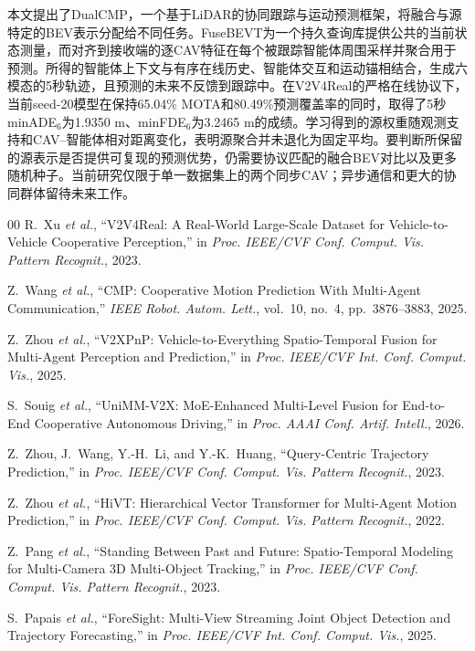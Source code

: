 \documentclass[lettersize,journal]{IEEEtran}
\begin{document}
本文提出了DualCMP，一个基于LiDAR的协同跟踪与运动预测框架，将融合与源特定的BEV表示分配给不同任务。FuseBEVT为一个持久查询库提供公共的当前状态测量，而对齐到接收端的逐CAV特征在每个被跟踪智能体周围采样并聚合用于预测。所得的智能体上下文与有序在线历史、智能体交互和运动锚相结合，生成六模态的5秒轨迹，且预测的未来不反馈到跟踪中。在V2V4Real的严格在线协议下，当前seed-20模型在保持65.04\% MOTA和80.49\%预测覆盖率的同时，取得了5秒minADE$_6$为1.9350 m、minFDE$_6$为3.2465 m的成绩。学习得到的源权重随观测支持和CAV--智能体相对距离变化，表明源聚合并未退化为固定平均。要判断所保留的源表示是否提供可复现的预测优势，仍需要协议匹配的融合BEV对比以及更多随机种子。当前研究仅限于单一数据集上的两个同步CAV；异步通信和更大的协同群体留待未来工作。

\begin{thebibliography}{00}
R.~Xu \emph{et al.}, ``V2V4Real: A Real-World Large-Scale Dataset for Vehicle-to-Vehicle Cooperative Perception,'' in \emph{Proc. IEEE/CVF Conf. Comput. Vis. Pattern Recognit.}, 2023.

Z.~Wang \emph{et al.}, ``CMP: Cooperative Motion Prediction With Multi-Agent Communication,'' \emph{IEEE Robot. Autom. Lett.}, vol.~10, no.~4, pp.~3876--3883, 2025.

Z.~Zhou \emph{et al.}, ``V2XPnP: Vehicle-to-Everything Spatio-Temporal Fusion for Multi-Agent Perception and Prediction,'' in \emph{Proc. IEEE/CVF Int. Conf. Comput. Vis.}, 2025.

S.~Souig \emph{et al.}, ``UniMM-V2X: MoE-Enhanced Multi-Level Fusion for End-to-End Cooperative Autonomous Driving,'' in \emph{Proc. AAAI Conf. Artif. Intell.}, 2026.

Z.~Zhou, J.~Wang, Y.-H.~Li, and Y.-K.~Huang, ``Query-Centric Trajectory Prediction,'' in \emph{Proc. IEEE/CVF Conf. Comput. Vis. Pattern Recognit.}, 2023.

Z.~Zhou \emph{et al.}, ``HiVT: Hierarchical Vector Transformer for Multi-Agent Motion Prediction,'' in \emph{Proc. IEEE/CVF Conf. Comput. Vis. Pattern Recognit.}, 2022.

Z.~Pang \emph{et al.}, ``Standing Between Past and Future: Spatio-Temporal Modeling for Multi-Camera 3D Multi-Object Tracking,'' in \emph{Proc. IEEE/CVF Conf. Comput. Vis. Pattern Recognit.}, 2023.

S.~Papais \emph{et al.}, ``ForeSight: Multi-View Streaming Joint Object Detection and Trajectory Forecasting,'' in \emph{Proc. IEEE/CVF Int. Conf. Comput. Vis.}, 2025.


\end{thebibliography}
\end{document}
